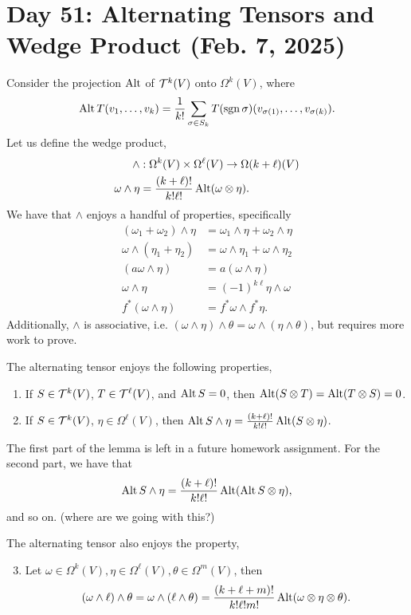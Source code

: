 \section{Day 51: Alternating Tensors and Wedge Product (Feb. 7, 2025)}
Consider the projection $\operatorname{Alt}$ of $\mathcal T^k(V)$ onto $\Omega^k(V)$, where
\[ \operatorname{Alt} T(v_1, \dots, v_k) = \frac{1}{k!} \sum_{\sigma \in S_k} T (\operatorname{sgn} \sigma) (v_{\sigma(1)}, \dots, v_{\sigma(k)}). \]
Let us define the wedge product,
\begin{align*}
    \wedge &: \Omega^k(V) \times \Omega^\ell(V) \to \Omega(k + \ell)(V) \\
    \omega \wedge \eta &= \frac{(k + \ell)!}{k! \ell!} \operatorname{Alt}(\omega \otimes \eta).
\end{align*}
We have that $\wedge$ enjoys a handful of properties, specifically
\begin{align*}
    (\omega_1 + \omega_2) \wedge \eta &= \omega_1 \wedge \eta + \omega_2 \wedge \eta \\
    \omega \wedge (\eta_1 + \eta_2) &= \omega \wedge \eta_1 + \omega \wedge \eta_2 \\
    (a\omega \wedge \eta) &= a (\omega \wedge \eta) \\
    \omega \wedge \eta &= (-1)^{k \ell} \eta \wedge \omega \\
    f^\ast (\omega \wedge \eta) &= f^\ast \omega \wedge f^\ast \eta.
\end{align*}
Additionally, $\wedge$ is associative, i.e. $(\omega \wedge \eta) \wedge \theta = \omega \wedge (\eta \wedge \theta)$, but requires more work to prove.
\begin{simplelemma}[Spivak 4-4]
    The alternating tensor enjoys the following properties,
    \begin{enumerate}[label=(\roman*)]
        \item If $S \in \mathcal T^k(V)$, $T \in \mathcal T^\ell(V)$, and $\operatorname{Alt} S = 0$, then $\operatorname{Alt} (S \otimes T) = \operatorname{Alt} (T \otimes S) = 0$.
        \item If $S \in \mathcal T^k(V)$, $\eta \in \Omega^\ell(V)$, then $\operatorname{Alt} S \wedge \eta = \frac{(k+\ell)!}{k! \ell!} \operatorname{Alt}(S \otimes \eta)$.
    \end{enumerate}
\end{simplelemma}
\noindent The first part of the lemma is left in a future homework assignment. For the second part, we have that
\[ \operatorname{Alt} S \wedge \eta = \frac{(k+\ell)!}{k! \ell!} \operatorname{Alt}(\operatorname{Alt} S \otimes \eta), \]
and so on. (where are we going with this?)
\begin{simplelemma}
    The alternating tensor also enjoys the property,
    \begin{enumerate}[label=(\roman*)]
        \setcounter{enumi}{2}
        \item Let $\omega \in \Omega^k(V), \eta \in \Omega^\ell(V), \theta \in \Omega^m(V)$, then
        \[ (\omega \wedge \ell) \wedge \theta = \omega \wedge (\ell \wedge \theta) = \frac{(k + \ell + m)!}{k! \ell! m!} \operatorname{Alt}(\omega \otimes \eta \otimes \theta). \]
    \end{enumerate}
\end{simplelemma}
